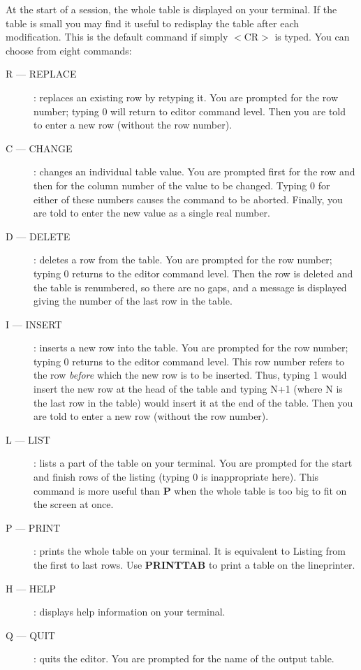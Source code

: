 \begin{description}
At the start of a session, the whole table is displayed on your terminal.
If the table is small you may find it useful to redisplay the table after each
modification.
This is the default command if simply $<$CR$>$ is typed.
You can choose from eight commands:
\begin{description}
\item [R --- REPLACE]:
replaces an existing row by retyping it.
You are prompted for the row number; typing 0 will return to editor command
level.
Then you are told to enter a new row (without the row number).
\item [C --- CHANGE]:
changes an individual table value.
You are prompted first for the row and then for the column number of the value
to be changed.
Typing 0 for either of these numbers causes the command to be aborted.
Finally, you are told to enter the new value as a single real number.
\item [D --- DELETE]:
deletes a row from the table.
You are prompted for the row number; typing 0 returns to the editor command
level.
Then the row is deleted and the table is renumbered, so there are no gaps, and
a message is displayed giving the number of the last row in the table.
\item [I --- INSERT]:
inserts a new row into the table.
You are prompted for the row number; typing 0 returns to the editor command
level.
This row number refers to the row {\em before} which the new row is to be
inserted.
Thus, typing 1 would insert the new row at the head of the table and typing N+1
(where N is the last row in the table) would insert it at the end of the table.
Then you are told to enter a new row (without the row number).
\item [L --- LIST]:
lists a part of the table on your terminal.
You are prompted for the start and finish rows of the listing (typing 0 is
inappropriate here).
This command is more useful than {\bf P} when the whole table is too big to fit
on the screen at once.
\item [P --- PRINT]:
prints the whole table on your terminal.
It is equivalent to Listing from the first to last rows.
Use {\bf PRINTTAB} to print a table on the lineprinter.
\item [H --- HELP]:
displays help information on your terminal.
\item [Q --- QUIT]:
quits the editor.
You are prompted for the name of the output table.
\end{description}
\end{description}

